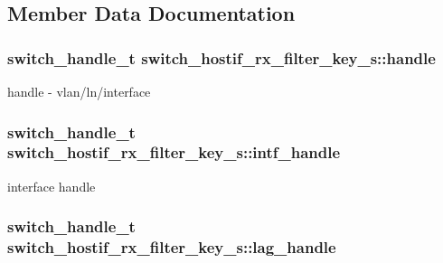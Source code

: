 \subsection{Member Data Documentation}
\hypertarget{structswitch__hostif__rx__filter__key__s_ac05d23838debbee2a660a3a0058211fb}{
\subsubsection[{handle}]{\setlength{\rightskip}{0pt plus 5cm}switch\+\_\+handle\+\_\+t switch\+\_\+hostif\+\_\+rx\+\_\+filter\+\_\+key\+\_\+s\+::handle}}\label{structswitch__hostif__rx__filter__key__s_ac05d23838debbee2a660a3a0058211fb}
handle -\/ vlan/ln/interface \hypertarget{structswitch__hostif__rx__filter__key__s_a40785f4d573665a2ad367fadc194cb6a}{
\subsubsection[{intf\+\_\+handle}]{\setlength{\rightskip}{0pt plus 5cm}switch\+\_\+handle\+\_\+t switch\+\_\+hostif\+\_\+rx\+\_\+filter\+\_\+key\+\_\+s\+::intf\+\_\+handle}}\label{structswitch__hostif__rx__filter__key__s_a40785f4d573665a2ad367fadc194cb6a}
interface handle \hypertarget{structswitch__hostif__rx__filter__key__s_acfcc73b37c5db1ac4c9b3479692b0122}{
\subsubsection[{lag\+\_\+handle}]{\setlength{\rightskip}{0pt plus 5cm}switch\+\_\+handle\+\_\+t switch\+\_\+hostif\+\_\+rx\+\_\+filter\+\_\+key\+\_\+s\+::lag\+\_\+handle}}\label{structswitch__hostif__rx__filter__key__s_acfcc73b37c5db1ac4c9b3479692b0122}
